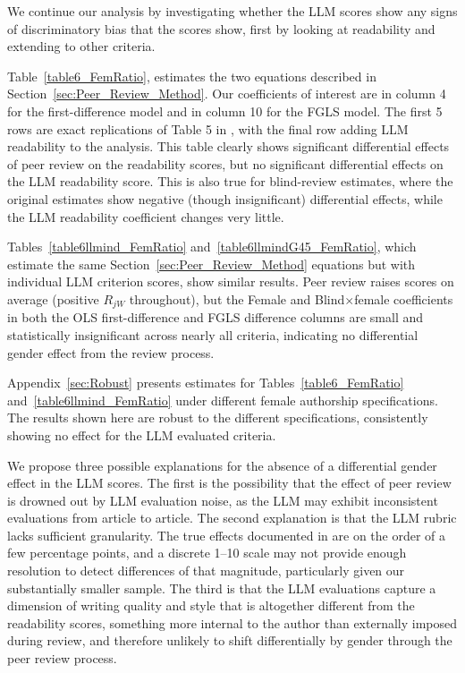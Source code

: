 We continue our analysis by investigating whether the LLM scores show any signs of discriminatory bias that the \textcite{hengel2022publishing} scores show, first by looking at readability and extending to other criteria.



Table~\ref{table6_FemRatio}, estimates the two equations described in Section~\ref{sec:Peer_Review_Method}. Our coefficients of interest are in column 4 for the first-difference model and in column 10 for the FGLS model. The first 5 rows are exact replications of Table 5 in \textcite{hengel2022publishing}, with the final row adding LLM readability to the analysis. This table clearly shows significant differential effects of peer review on the \textcite{hengel2022publishing} readability scores, but no significant differential effects on the LLM readability score. This is also true for blind-review estimates, where the original estimates show negative (though insignificant) differential effects, while the LLM readability coefficient changes very little.





Tables~\ref{table6llmind_FemRatio} and~\ref{table6llmindG45_FemRatio}, which estimate the same Section~\ref{sec:Peer_Review_Method} equations but with individual LLM criterion scores, show similar results. Peer review raises scores on average (positive $R_{jW}$ throughout), but the Female and Blind$\times$female coefficients in both the OLS first-difference and FGLS difference columns are small and statistically insignificant across nearly all criteria, indicating no differential gender effect from the review process.

Appendix~\ref{sec:Robust} presents estimates for Tables~\ref{table6_FemRatio} and~\ref{table6llmind_FemRatio} under different female authorship specifications. The results shown here are robust to the different specifications, consistently showing no effect for the LLM evaluated criteria.

We propose three possible explanations for the absence of a differential gender effect in the LLM scores. The first is the possibility that the effect of peer review is drowned out by LLM evaluation noise, as the LLM may exhibit inconsistent evaluations from article to article. The second explanation is that the LLM rubric lacks sufficient granularity. The true effects documented in \textcite{hengel2022publishing} are on the order of a few percentage points, and a discrete 1–10 scale may not provide enough resolution to detect differences of that magnitude, particularly given our substantially smaller sample. The third is that the LLM evaluations capture a dimension of writing quality and style that is altogether different from the \cite{hengel2022publishing} readability scores, something more internal to the author than externally imposed during review, and therefore unlikely to shift differentially by gender through the peer review process.

